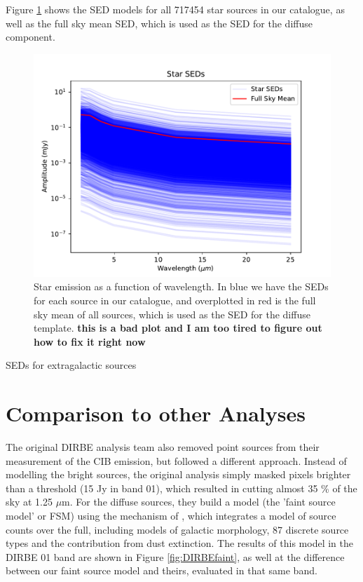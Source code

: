 \documentclass{aa}
\begin{document}
Figure \ref{fig:starSEDs} shows the SED models for all 717454 star sources in our catalogue, as well as the full sky mean SED, which is used as the SED for the diffuse component. 

\begin{figure}
  \includegraphics[width=\columnwidth]{figs/starseds/star_seds.pdf}
  \caption{Star emission as a function of wavelength. In blue we have the SEDs for each source in our catalogue, and overplotted in red is the full sky mean of all sources, which is used as the SED for the diffuse template. \textbf{this is a bad plot and I am too tired to figure out how to fix it right now}}
  \label{fig:starSEDs}
\end{figure}

SEDs for extragalactic sources


\section{Comparison to other Analyses}
\label{sec:consistency}

The original DIRBE analysis team \citep{dirbeFaint} also removed point sources from their measurement of the CIB emission, but followed a different approach. Instead of modelling the bright sources, the original analysis simply masked pixels brighter than a threshold (15 Jy in band 01), which resulted in cutting almost 35 \% of the sky at 1.25 $\mu$m. For the diffuse sources, they build a model (the 'faint source model' or FSM) using the mechanism of \cite{wainscoat}, which integrates a model of source counts over the full, including models of galactic morphology, 87 discrete source types and the contribution from dust extinction. The results of this model in the DIRBE 01 band are shown in Figure \ref{fig:DIRBEfaint}, as well at the difference between our faint source model and theirs, evaluated in that same band. 
\end{document}
